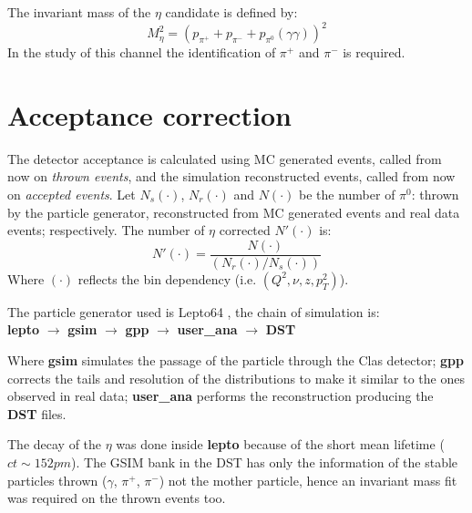 The invariant mass of the $\eta$ candidate is defined by:
\begin{equation}
M_{\eta}^2 = (p_{\pi^+}+p_{\pi^-}+p_{\pi^0}(\gamma\gamma))^2
\end{equation}
In the study of this channel the identification of $\pi^+$ and $\pi^-$ is required.
\clearpage
\section{Acceptance correction}
The detector acceptance is calculated using MC generated events, called from now on \textit{thrown events}, and the simulation reconstructed events, called from now on \textit{accepted events}. 
Let $N_s(\cdot)$,  $N_r(\cdot)$ and $N(\cdot)$ be the number of $\pi^0$: thrown by the particle generator, reconstructed from MC generated events and real data events; respectively. The number of $\eta$ corrected $N'(\cdot)$ is:
\begin{equation}
N'(\cdot) = \frac{N(\cdot)}{(N_r(\cdot)/N_s(\cdot))}
\end{equation}
Where $(\cdot)$ reflects the bin dependency (i.e. $(Q^2,\nu,z,p_T^2)$).

The particle generator used is Lepto64 \cite{lepto}, the chain of simulation is:\\
\textbf{lepto} $\rightarrow$ \textbf{gsim} $\rightarrow$ \textbf{gpp} $\rightarrow$ \textbf{user\_ana} $\rightarrow$ \textbf{DST}

Where \textbf{gsim} simulates the passage of the particle through the Clas detector; \textbf{gpp} corrects the tails and resolution of the distributions to make it similar to the ones observed in real data; \textbf{user\_ana} performs the reconstruction producing the \textbf{DST} files.

The decay of the $\eta$ was done inside \textbf{lepto} because of the short mean lifetime ($ct \sim 152pm$). The GSIM bank in the DST has only the information of the stable particles thrown ($\gamma$, $\pi^+$, $\pi^-$) not the mother particle, hence an invariant mass fit was required on the thrown events too.

